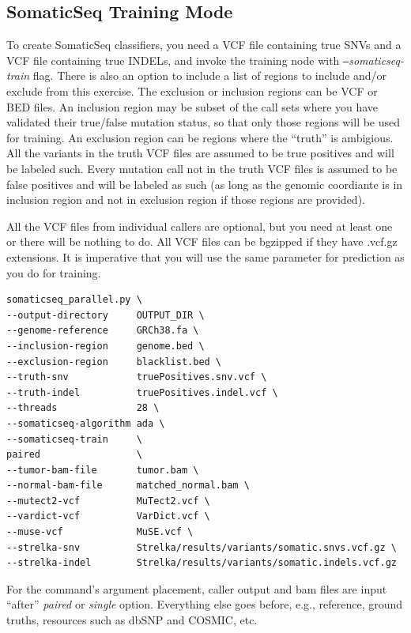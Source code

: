 \documentclass[10pt,letterpaper]{article}
\begin{document}
\begin{sloppypar}
\subsection{SomaticSeq Training Mode} \label{somaticseq_train}

To create SomaticSeq classifiers, you need a VCF file containing true SNVs and a VCF file containing true INDELs, and invoke the training node with \emph{\texttt{--}somaticseq-train} flag. There is also an option to include a list of regions to include and/or exclude from this exercise. The exclusion or inclusion regions can be VCF or BED files. An inclusion region may be subset of the call sets where you have validated their true/false mutation status, so that only those regions will be used for training. An exclusion region can be regions where the ``truth'' is ambigious. All the variants in the truth VCF files are assumed to be true positives and will be labeled such. Every mutation call not in the truth VCF files is assumed to be false positives and will be labeled as such (as long as the genomic coordiante is in inclusion region and not in exclusion region if those regions are provided). 

All the VCF files from individual callers are optional, but you need at least one or there will be nothing to do. All VCF files can be bgzipped if they have .vcf.gz extensions. It is imperative that you will use the same parameter for prediction as you do for training. 


\begin{lstlisting}
somaticseq_parallel.py \
--output-directory     OUTPUT_DIR \
--genome-reference     GRCh38.fa \
--inclusion-region     genome.bed \
--exclusion-region     blacklist.bed \
--truth-snv            truePositives.snv.vcf \
--truth-indel          truePositives.indel.vcf \
--threads              28 \
--somaticseq-algorithm ada \
--somaticseq-train     \
paired                 \
--tumor-bam-file       tumor.bam \
--normal-bam-file      matched_normal.bam \
--mutect2-vcf          MuTect2.vcf \
--vardict-vcf          VarDict.vcf \
--muse-vcf             MuSE.vcf \
--strelka-snv          Strelka/results/variants/somatic.snvs.vcf.gz \
--strelka-indel        Strelka/results/variants/somatic.indels.vcf.gz
\end{lstlisting}


For the command's argument placement, caller output and bam files are input ``after'' \textit{paired} or \textit{single} option. Everything else goes before, e.g., reference, ground truths, resources such as dbSNP and COSMIC, etc. 


\end{sloppypar}
\end{document}
